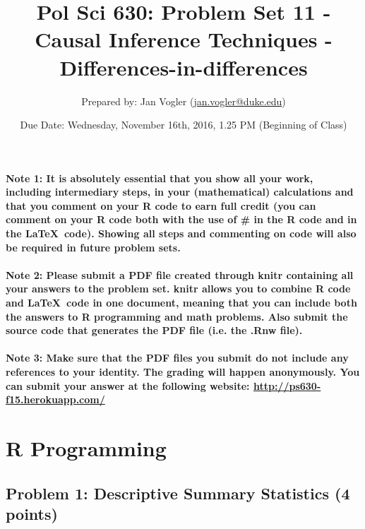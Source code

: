 \documentclass[12pt]{article}
\begin{document}
\title{Pol Sci 630: Problem Set 11 - Causal Inference Techniques - Differences-in-differences}

\author{Prepared by: Jan Vogler (\href{mailto:jan.vogler@duke.edu}{jan.vogler@duke.edu})}

\date{Due Date: Wednesday, November 16th, 2016, 1.25 PM (Beginning of Class)}
 
\maketitle 



\paragraph{Note 1: It is absolutely essential that you show all your work, including intermediary steps, in your (mathematical) calculations and that you comment on your R code to earn full credit (you can comment on your R code both with the use of \# in the R code and in the \LaTeX \ code). Showing all steps and commenting on code will also be required in future problem sets.}

\paragraph{Note 2: Please submit a PDF file created through knitr containing all your answers to the problem set. knitr allows you to combine R code and \LaTeX \ code in one document, meaning that you can include both the answers to R programming and math problems. Also submit the source code that generates the PDF file (i.e. the .Rnw file).}

\paragraph{Note 3: Make sure that the PDF files you submit do not include any references to your identity. The grading will happen anonymously. You can submit your answer at the following website: \url{http://ps630-f15.herokuapp.com/}}



\section*{R Programming}

\subsection*{Problem 1: Descriptive Summary Statistics (4 points)}
\end{document}
